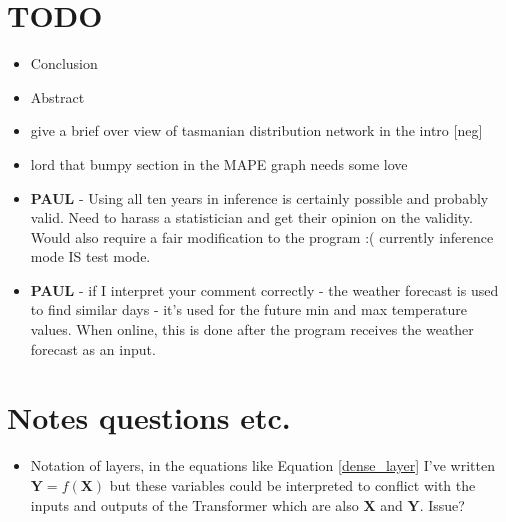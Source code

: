 \documentclass[conference]{IEEEtran}
\begin{document}
\section{TODO} 
\begin{itemize}
	\item Conclusion
	\item Abstract
	\item give a brief over view of tasmanian distribution network in the intro [neg]
	\item lord that bumpy section in the MAPE graph needs some love
	
	\item \textbf{PAUL} - Using all ten years in inference is certainly possible and probably valid. Need to harass a statistician and get their opinion on the validity. Would also require a fair modification to the program :(  currently inference mode IS test mode.
	\item \textbf{PAUL} - if I interpret your comment correctly - the weather forecast is used to find similar days - it's used for the future min and max temperature values. When online, this is done after the program receives the weather forecast as an input.
	
	
	
	
	
\end{itemize}

\section{Notes questions etc.} 
\begin{itemize}
	\item Notation of layers, in the equations like Equation \ref{dense_layer} I've written $\textbf{Y} = f(\textbf{X})$ but these variables could be interpreted to conflict with the inputs and outputs of the Transformer which are also $\textbf{X}$ and $\textbf{Y}$. Issue?
\end{itemize}
\end{document}
